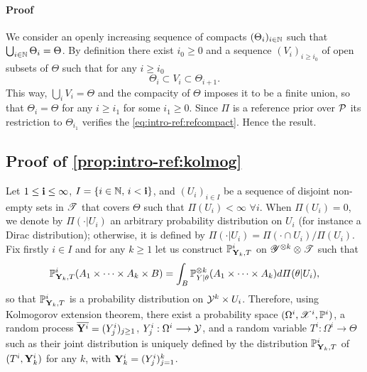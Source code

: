 \paragraph{Proof} 
We consider an openly increasing sequence of compacts $(\Theta_i)_{i\in\mathbb{N}}$ such that $\bigcup_{i\in\mathbb{N}}\Theta_i = \Theta$.
By definition there exist $i_0\geq0$ and a sequence $(V_i)_{i\geq i_0}$ of open subsets of $\Theta$  such that for any $i\geq i_0$
    \begin{equation}
        \Theta_i\subset V_i\subset \Theta_{i+1}.
    \end{equation}
This way, $\bigcup_iV_i=\Theta$ and the compacity of $\Theta$ imposes it to  be a finite union, so that $\Theta_i=\Theta$ for any $i\geq i_1$ for some $i_1\geq0$.
Since $\varPi$ is a reference prior over $\mathcal{P}$ its restriction to $\Theta_{i_1}$ verifies the \cref{eq:intro-ref:refcompact}. Hence the result.



\subsection{Proof of \cref{prop:intro-ref:kolmog}}\label{sec:intro-ref:proof}



Let $1\leq\mathbf{i}\leq\infty$, $I=\{i\in\mathbb{N},\,i<\mathbf{i}\}$, and $(U_i)_{i\in I}$ be a sequence of disjoint non-empty sets in $\mathscr{T}$ that covers $\Theta$ such that $\varPi(U_i)<\infty$ $\forall i$.
When $\varPi(U_i)=0$, we denote by $\varPi(\cdot|U_i)$ an arbitrary probability distribution on $U_i$ (for instance a Dirac distribution); otherwise, it is defined by $\varPi(\cdot|U_i)=\varPi(\cdot\cap U_i)/\varPi(U_i)$.
    Fix firstly $i\in I$ and for any $k\geq1$ let us construct $\mathbb{P}_{\mathbf{Y}_k,T}^i$ on $\mathscr{Y}^{\otimes k}\otimes\mathscr{T}$ such that
        \begin{equation}
            \mathbb{P}_{\mathbf{Y}_k,T}^i(A_1\times\dots\times A_k\times B) = \int_B \mathbb{P}_{Y|\theta}^{\otimes k}(A_1\times\dots\times A_k)d\varPi(\theta|U_i),
        \end{equation}
     so that $\mathbb{P}^i_{\mathbf{Y}_k,T}$ is a probability distribution on $\mathcal{Y}^k\times U_i$. 
    Therefore, using Kolmogorov extension theorem, there exist a probability space $(\Omega^i,\mathscr{X}^i,\mathbb{P}^i)$, a random process $\overline{\mathbf{Y}^i}=(Y^i_j)_{j\geq1}$, $Y_j^i:\Omega^i\longrightarrow\mathcal{Y}$, and a random variable $T^i:\Omega^i\to\Theta$ such as  their joint distribution is uniquely defined by the distribution
    $\mathbb{P}^i_{\mathbf{Y}_k,T}$ of $(T^i,\mathbf{Y}_k^i)$ for any $k$, with $\mathbf{Y}_k^i=(Y_j^i)_{j=1}^k$.




